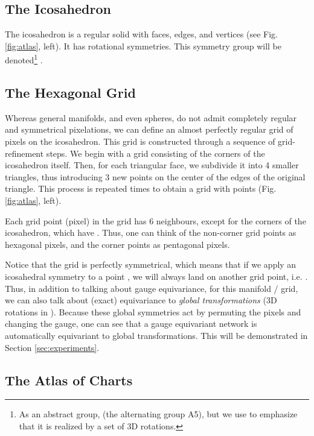 \documentclass{article}
\begin{document}
\subsection{The Icosahedron}
\label{sec:the_icosahedron}

The icosahedron is a regular solid with  faces,  edges, and  vertices (see Fig. \ref{fig:atlas}, left).
It has  rotational symmetries.
This symmetry group will be denoted\footnote{As an abstract group,  (the alternating group A5), but we use  to emphasize that it is realized by a set of 3D rotations.} .


\subsection{The Hexagonal Grid}
\label{sec:grid}

Whereas general manifolds, and even spheres, do not admit completely regular and symmetrical pixelations, we can define an almost perfectly regular grid of pixels on the icosahedron.
This grid is constructed through a sequence of grid-refinement steps.
We begin with a grid  consisting of the corners of the icosahedron itself.
Then, for each triangular face, we subdivide it into 4 smaller triangles, thus introducing 3 new points on the center of the edges of the original triangle.
This process is repeated  times to obtain a grid  with  points (Fig. \ref{fig:atlas}, left).

Each grid point (pixel) in the grid has 6 neighbours, except for the corners of the icosahedron, which have .
Thus, one can think of the non-corner grid points as hexagonal pixels, and the corner points as pentagonal pixels.

Notice that the grid  is perfectly symmetrical, which means that if we apply an icosahedral symmetry  to a point , we will always land on another grid point, i.e. .
Thus, in addition to talking about gauge equivariance, for this manifold / grid, we can also talk about (exact) equivariance to \emph{global transformations} (3D rotations in ).
Because these global symmetries act by permuting the pixels and changing the gauge, one can see that a gauge equivariant network is automatically equivariant to global transformations.
This will be demonstrated in Section \ref{sec:experiments}.


\subsection{The Atlas of Charts}
\label{sec:atlas}
\end{document}
